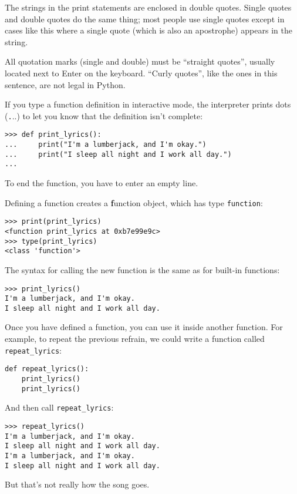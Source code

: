 \documentclass[
DIV=11,
fontsize=13,
twoside,
headinclude=false,
titlepage=firstiscover,
abstract=true,
headsepline=true,
footsepline=true,
chapterprefix=true, %
headings=big,
bibliography=totoc,%
captions=tableheading
]{scrbook}
\theoremstyle{definition}
\begin{document}
The strings in the print statements are enclosed in double
quotes.  Single quotes and double quotes do the same thing;
most people use single quotes except in cases like this where
a single quote (which is also an apostrophe) appears in the string.

All quotation marks (single and double)
must be ``straight quotes'', usually
located next to Enter on the keyboard.  ``Curly quotes'', like
the ones in this sentence, are not legal in Python.

If you type a function definition in interactive mode, the interpreter
prints dots ({\texttt ...}) to let you know that the definition
isn't complete:

\begin{lstlisting}
>>> def print_lyrics():
...     print("I'm a lumberjack, and I'm okay.")
...     print("I sleep all night and I work all day.")
...
\end{lstlisting}
%
To end the function, you have to enter an empty line.

Defining a function creates a {\textbf function object}, which
has type \verb"function":

\begin{lstlisting}
>>> print(print_lyrics)
<function print_lyrics at 0xb7e99e9c>
>>> type(print_lyrics)
<class 'function'>
\end{lstlisting}
%
The syntax for calling the new function is the same as
for built-in functions:

\begin{lstlisting}
>>> print_lyrics()
I'm a lumberjack, and I'm okay.
I sleep all night and I work all day.
\end{lstlisting}
%
Once you have defined a function, you can use it inside another
function.  For example, to repeat the previous refrain, we could write
a function called \verb"repeat_lyrics":

\begin{lstlisting}
def repeat_lyrics():
    print_lyrics()
    print_lyrics()
\end{lstlisting}
%
And then call \verb"repeat_lyrics":

\begin{lstlisting}
>>> repeat_lyrics()
I'm a lumberjack, and I'm okay.
I sleep all night and I work all day.
I'm a lumberjack, and I'm okay.
I sleep all night and I work all day.
\end{lstlisting}
%
But that's not really how the song goes.
\end{document}
